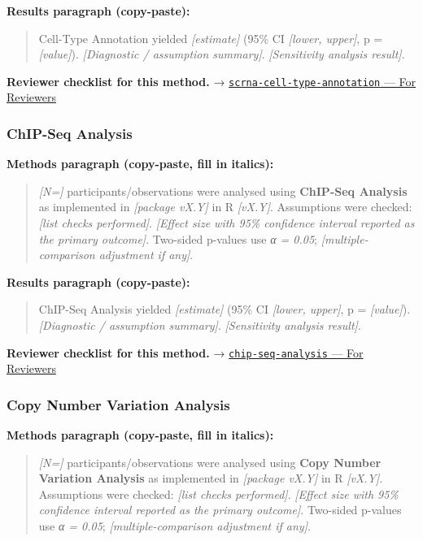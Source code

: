\documentclass[
]{article}
\begin{document}
\textbf{Results paragraph (copy-paste):}

\begin{quote}
Cell-Type Annotation yielded \emph{{[}estimate{]}} (95\% CI
\emph{{[}lower, upper{]}}, p = \emph{{[}value{]}}). \emph{{[}Diagnostic
/ assumption summary{]}}. \emph{{[}Sensitivity analysis result{]}}.
\end{quote}

\textbf{Reviewer checklist for this method.} →
\href{../chapters/12-bioinformatics/scrna-cell-type-annotation.Rmd\#for-reviewers}{\texttt{scrna-cell-type-annotation}
--- For Reviewers}

\subsubsection{ChIP-Seq Analysis}\label{chip-seq-analysis}

\textbf{Methods paragraph (copy-paste, fill in italics):}

\begin{quote}
\emph{{[}N={]}} participants/observations were analysed using
\textbf{ChIP-Seq Analysis} as implemented in \emph{{[}package vX.Y{]}}
in R \emph{{[}vX.Y{]}}. Assumptions were checked: \emph{{[}list checks
performed{]}}. \emph{{[}Effect size with 95\% confidence interval
reported as the primary outcome{]}}. Two-sided p-values use \emph{α =
0.05}; \emph{{[}multiple-comparison adjustment if any{]}}.
\end{quote}

\textbf{Results paragraph (copy-paste):}

\begin{quote}
ChIP-Seq Analysis yielded \emph{{[}estimate{]}} (95\% CI \emph{{[}lower,
upper{]}}, p = \emph{{[}value{]}}). \emph{{[}Diagnostic / assumption
summary{]}}. \emph{{[}Sensitivity analysis result{]}}.
\end{quote}

\textbf{Reviewer checklist for this method.} →
\href{../chapters/12-bioinformatics/chip-seq-analysis.Rmd\#for-reviewers}{\texttt{chip-seq-analysis}
--- For Reviewers}

\subsubsection{Copy Number Variation
Analysis}\label{copy-number-variation-analysis}

\textbf{Methods paragraph (copy-paste, fill in italics):}

\begin{quote}
\emph{{[}N={]}} participants/observations were analysed using
\textbf{Copy Number Variation Analysis} as implemented in
\emph{{[}package vX.Y{]}} in R \emph{{[}vX.Y{]}}. Assumptions were
checked: \emph{{[}list checks performed{]}}. \emph{{[}Effect size with
95\% confidence interval reported as the primary outcome{]}}. Two-sided
p-values use \emph{α = 0.05}; \emph{{[}multiple-comparison adjustment if
any{]}}.
\end{quote}
\end{document}
